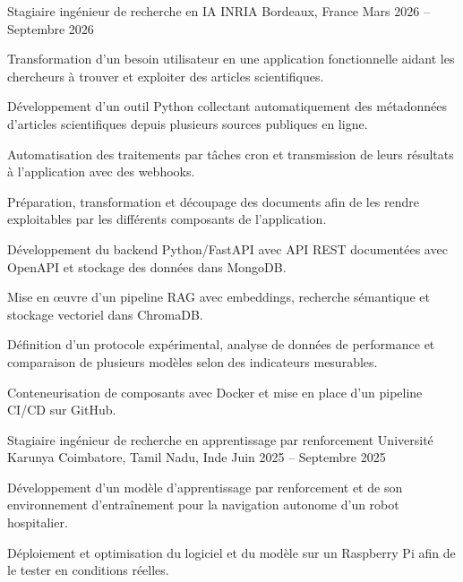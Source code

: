 
\begin{cventries}
  \cventry
    {Stagiaire ingénieur de recherche en IA}
    {INRIA}
    {Bordeaux, France}
    {Mars 2026 -- Septembre 2026}
    {
      \begin{cvitems}
        \item {Transformation d’un besoin utilisateur en une application fonctionnelle aidant les chercheurs à trouver et exploiter des articles scientifiques.}
        \item {Développement d’un outil Python collectant automatiquement des métadonnées d’articles scientifiques depuis plusieurs sources publiques en ligne.}
        \item {Automatisation des traitements par tâches cron et transmission de leurs résultats à l’application avec des webhooks.}
        \item {Préparation, transformation et découpage des documents afin de les rendre exploitables par les différents composants de l’application.}
        \item {Développement du backend Python/FastAPI avec API REST documentées avec OpenAPI et stockage des données dans MongoDB.}
        \item {Mise en œuvre d’un pipeline RAG avec embeddings, recherche sémantique et stockage vectoriel dans ChromaDB.}
        \item {Définition d’un protocole expérimental, analyse de données de performance et comparaison de plusieurs modèles selon des indicateurs mesurables.}
        \item {Conteneurisation de composants avec Docker et mise en place d’un pipeline CI/CD sur GitHub.}
      \end{cvitems}
    }

  \cventry
    {Stagiaire ingénieur de recherche en apprentissage par renforcement}
    {Université Karunya}
    {Coimbatore, Tamil Nadu, Inde}
    {Juin 2025 -- Septembre 2025}
    {
      \begin{cvitems}
        \item {Développement d’un modèle d’apprentissage par renforcement et de son environnement d’entraînement pour la navigation autonome d’un robot hospitalier.}
        \item {Déploiement et optimisation du logiciel et du modèle sur un Raspberry Pi afin de le tester en conditions réelles.}
      \end{cvitems}
    }
\end{cventries}
